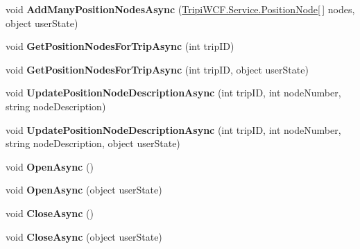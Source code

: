 \begin{DoxyCompactItemize}
\item 
\hypertarget{class_trip_service_client_a147922917a913388759724c9c4a0ff5f}{
void {\bfseries AddManyPositionNodesAsync} (\hyperlink{class_tripi_w_c_f_1_1_service_1_1_position_node}{TripiWCF.Service.PositionNode}\mbox{[}$\,$\mbox{]} nodes, object userState)}
\label{class_trip_service_client_a147922917a913388759724c9c4a0ff5f}

\item 
\hypertarget{class_trip_service_client_a951dcd79dea5f318face9724af2fffa9}{
void {\bfseries GetPositionNodesForTripAsync} (int tripID)}
\label{class_trip_service_client_a951dcd79dea5f318face9724af2fffa9}

\item 
\hypertarget{class_trip_service_client_af0903820950892fbd3063b8af0683e1f}{
void {\bfseries GetPositionNodesForTripAsync} (int tripID, object userState)}
\label{class_trip_service_client_af0903820950892fbd3063b8af0683e1f}

\item 
\hypertarget{class_trip_service_client_ae0206ac4c1512e02325e7d9c43742586}{
void {\bfseries UpdatePositionNodeDescriptionAsync} (int tripID, int nodeNumber, string nodeDescription)}
\label{class_trip_service_client_ae0206ac4c1512e02325e7d9c43742586}

\item 
\hypertarget{class_trip_service_client_adf4c752d120c04283d6052aa1c9405dd}{
void {\bfseries UpdatePositionNodeDescriptionAsync} (int tripID, int nodeNumber, string nodeDescription, object userState)}
\label{class_trip_service_client_adf4c752d120c04283d6052aa1c9405dd}

\item 
\hypertarget{class_trip_service_client_a503f35d50a103ae9c704a8556a495317}{
void {\bfseries OpenAsync} ()}
\label{class_trip_service_client_a503f35d50a103ae9c704a8556a495317}

\item 
\hypertarget{class_trip_service_client_a766c4bf2b4c822c96d24bca6ab19de05}{
void {\bfseries OpenAsync} (object userState)}
\label{class_trip_service_client_a766c4bf2b4c822c96d24bca6ab19de05}

\item 
\hypertarget{class_trip_service_client_af7270b9fb14203468c5dc31e20a8481b}{
void {\bfseries CloseAsync} ()}
\label{class_trip_service_client_af7270b9fb14203468c5dc31e20a8481b}

\item 
\hypertarget{class_trip_service_client_a8e789b6b99bd805a926fc81c1c5b3f8a}{
void {\bfseries CloseAsync} (object userState)}
\label{class_trip_service_client_a8e789b6b99bd805a926fc81c1c5b3f8a}

\end{DoxyCompactItemize}
